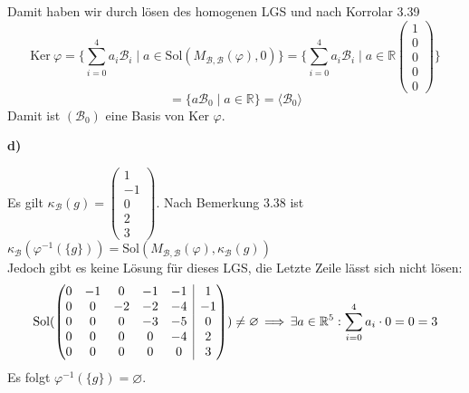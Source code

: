 \documentclass[a4paper,graphics,11pt]{article}
\begin{document}
Damit haben wir durch lösen des homogenen LGS und nach Korrolar 3.39
$$
    \text{Ker}\ \varphi
    = \{\sum_{i=0}^{4} a_i\mathcal{B}_i \mid a \in \text{Sol}(M_{\mathcal{B},\mathcal{B}}(\varphi), 0)\}
    = \{\sum_{i=0}^{4} a_i\mathcal{B}_i \mid a \in \mathbb{R}
    \begin{pmatrix}
        1\\
        0\\
        0\\
        0\\
        0
    \end{pmatrix}
    \}
$$$$
    = \{a\mathcal{B}_0 \mid a \in \mathbb{R}\}
    = \langle \mathcal{B}_0 \rangle
$$
Damit ist $(\mathcal{B}_0)$ eine Basis von Ker $\varphi$.
\newpage

\textbf{d)}

Es gilt
$   \kappa_{\mathcal{B}}(g)
    = \begin{pmatrix}
        1\\
        -1\\
        0\\
        2\\
        3
    \end{pmatrix}
$.
Nach Bemerkung 3.38 ist
$\kappa_{\mathcal{B}}(\varphi^{-1}(\{g\}))
= \text{Sol}(M_{\mathcal{B}, \mathcal{B}}(\varphi), \kappa_{\mathcal{B}}(g))$\\
Jedoch gibt es keine Lösung für dieses LGS, die Letzte Zeile lässt sich nicht lösen:
$$
\text{Sol}(\begin{array}({@{}ccccc|c@{}})
        0 & -1 & 0 & -1 & -1 & 1\\
        0 & 0 & -2 & -2 & -4 & -1\\
        0 & 0 & 0 & -3 & -5 & 0\\
        0 & 0 & 0 & 0 & -4 & 2\\
        0 & 0 & 0 & 0 & 0 & 3\\
\end{array}
) \neq \varnothing
\,\Longrightarrow\, \exists a \in \mathbb{R}^5 : \sum_{i=0}^{4} a_i\cdot 0 = 0 = 3
$$
Es folgt $\varphi^{-1}(\{g\}) = \varnothing$.
\end{document}
